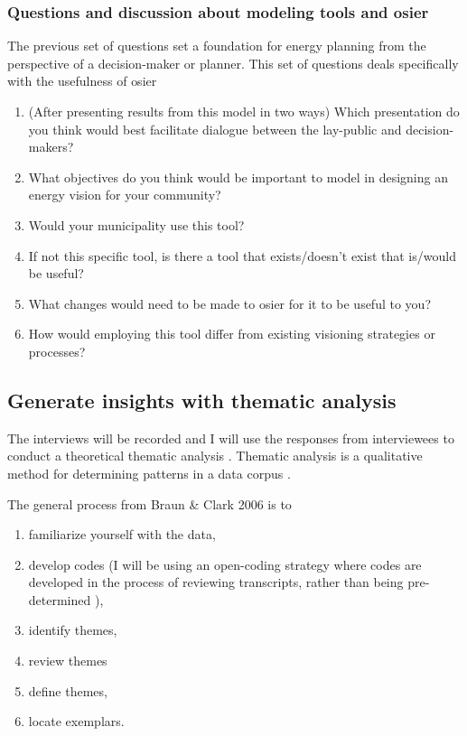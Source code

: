 \subsubsection{Questions and discussion about modeling tools and \ac{osier}} The
previous set of questions set a foundation for energy planning from the
perspective of a decision-maker or planner. This set of questions deals
specifically with the usefulness of \ac{osier} 

\begin{enumerate}
    \item (After presenting results from this model in two ways) Which
    presentation do you think would best facilitate dialogue between the
    lay-public and decision-makers?
    \item What objectives do you think would be important to model in designing
    an energy vision for your community?
    \item Would your municipality use this tool? 
    \item If not this specific tool, is there a tool that exists/doesn't exist
    that is/would be useful?
    \item What changes would need to be made to \ac{osier} for it to be useful
    to you?
    \item How would employing this tool differ from existing visioning
    strategies or processes?
\end{enumerate}

\subsection{Generate insights with thematic analysis}

The interviews will be recorded and I will use the responses from interviewees
to conduct a theoretical thematic analysis
\cite{braun_toward_2023,maguire_doing_2017,scharp_what_2019}. Thematic analysis
is a qualitative method for determining patterns in a data corpus
\cite{scharp_what_2019}. 

The general process from Braun \& Clark 2006 \cite{braun_using_2006} is to
\begin{enumerate}
    \item familiarize yourself with the data,
    \item develop codes (I will be using an open-coding strategy where codes are
    developed in the process of reviewing transcripts, rather than being
    pre-determined \cite{maguire_doing_2017}),
    \item identify themes,
    \item review themes
    \item define themes, 
    \item locate exemplars.
\end{enumerate}



